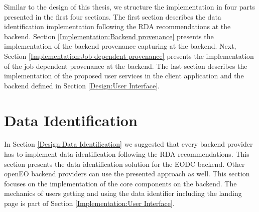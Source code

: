 \documentclass[draft,final]{vutinfth} %
\begin{document}
Similar to the design of this thesis, we structure the implementation in four parts presented in the first four sections. The first section describes the data identification implementation following the RDA recommendations at the backend. Section \ref{Implementation:Backend provenance} presents the implementation of the backend provenance capturing at the backend. Next, Section \ref{Implementation:Job dependent provenance} presents the implementation of the job dependent provenance at the backend. The last section describes the implementation of the proposed user services in the client application and the backend defined in Section \ref{Design:User Interface}.     

\section{Data Identification}\label{Implementation:Data Identification}

In Section \ref{Design:Data Identification} we suggested that every backend provider has to implement data identification following the RDA recommendations. This section presents the data identification solution for the EODC backend. Other openEO backend providers can use the presented approach as well. This section focuses on the implementation of the core components on the backend. The mechanics of users getting and using the data identifier including the landing page is part of Section \ref{Implementation:User Interface}. \\
\end{document}
